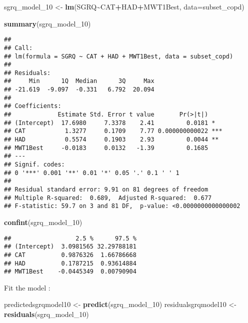 \documentclass[
]{article}
\newenvironment{Shaded}{\begin{snugshade}}{\end{snugshade}}
\newcommand{\AttributeTok}[1]{\textcolor[rgb]{0.13,0.29,0.53}{#1}}
\newcommand{\FunctionTok}[1]{\textcolor[rgb]{0.13,0.29,0.53}{\textbf{#1}}}
\newcommand{\NormalTok}[1]{#1}
\newcommand{\OtherTok}[1]{\textcolor[rgb]{0.56,0.35,0.01}{#1}}
\newcommand{\SpecialCharTok}[1]{\textcolor[rgb]{0.81,0.36,0.00}{\textbf{#1}}}
\begin{document}
\begin{Shaded}
\begin{Highlighting}[]
\NormalTok{sgrq\_model\_10 }\OtherTok{\textless{}{-}} \FunctionTok{lm}\NormalTok{(SGRQ}\SpecialCharTok{\textasciitilde{}}\NormalTok{CAT}\SpecialCharTok{+}\NormalTok{HAD}\SpecialCharTok{+}\NormalTok{MWT1Best, }\AttributeTok{data=}\NormalTok{subset\_copd)}
\end{Highlighting}
\end{Shaded}

\begin{Shaded}
\begin{Highlighting}[]
\FunctionTok{summary}\NormalTok{(sgrq\_model\_10)}
\end{Highlighting}
\end{Shaded}

\begin{verbatim}
## 
## Call:
## lm(formula = SGRQ ~ CAT + HAD + MWT1Best, data = subset_copd)
## 
## Residuals:
##     Min      1Q  Median      3Q     Max 
## -21.619  -9.097  -0.331   6.792  20.094 
## 
## Coefficients:
##             Estimate Std. Error t value       Pr(>|t|)    
## (Intercept)  17.6980     7.3378    2.41         0.0181 *  
## CAT           1.3277     0.1709    7.77 0.000000000022 ***
## HAD           0.5574     0.1903    2.93         0.0044 ** 
## MWT1Best     -0.0183     0.0132   -1.39         0.1685    
## ---
## Signif. codes:  
## 0 '***' 0.001 '**' 0.01 '*' 0.05 '.' 0.1 ' ' 1
## 
## Residual standard error: 9.91 on 81 degrees of freedom
## Multiple R-squared:  0.689,  Adjusted R-squared:  0.677 
## F-statistic: 59.7 on 3 and 81 DF,  p-value: <0.0000000000000002
\end{verbatim}

\begin{Shaded}
\begin{Highlighting}[]
\FunctionTok{confint}\NormalTok{(sgrq\_model\_10)}
\end{Highlighting}
\end{Shaded}

\begin{verbatim}
##                  2.5 %      97.5 %
## (Intercept)  3.0981565 32.29788181
## CAT          0.9876326  1.66786668
## HAD          0.1787215  0.93614884
## MWT1Best    -0.0445349  0.00790904
\end{verbatim}

Fit the model :

\begin{Shaded}
\begin{Highlighting}[]
\NormalTok{predictedsgrqmodel10 }\OtherTok{\textless{}{-}} \FunctionTok{predict}\NormalTok{(sgrq\_model\_10)}
\NormalTok{residualsgrqmodel10 }\OtherTok{\textless{}{-}} \FunctionTok{residuals}\NormalTok{(sgrq\_model\_10)}
\end{Highlighting}
\end{Shaded}
\end{document}
